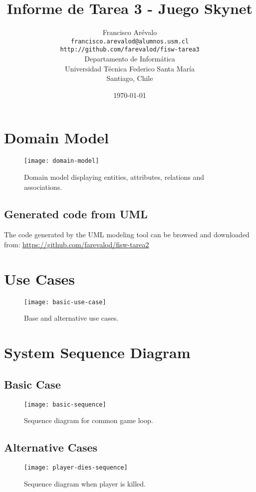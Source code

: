 \documentclass{article}
\begin{document}
\title{Informe de Tarea 3 - Juego Skynet}
\author{Francisco Ar\'evalo\\
  \texttt{francisco.arevalod@alumnos.usm.cl}\\
  \texttt{http://github.com/farevalod/fisw-tarea3}\\
  \vspace{10mm}
  Departamento de Inform\'atica\\
  Universidad T\'ecnica Federico Santa Mar\'ia\\
  Santiago, Chile}
\date{\today}
\maketitle
\tableofcontents
\section{Domain Model}
\begin{figure}[htb]
\centering
\texttt{[image: domain-model]}
\caption{Domain model displaying entities, attributes, relations and associations.}
\end{figure}
\subsection{Generated code from UML}
The code generated by the UML modeling tool can be browsed and downloaded from: 
\url{https://github.com/farevalod/fisw-tarea2}
\section{Use Cases}
\begin{figure}[htb]
\centering
\texttt{[image: basic-use-case]}
\caption{Base and alternative use cases.}
\end{figure}
\section{System Sequence Diagram}
\subsection{Basic Case}
\begin{figure}[htb]
\centering
\texttt{[image: basic-sequence]}
\caption{Sequence diagram for common game loop.}
\end{figure}
\subsection{Alternative Cases}
\begin{figure}[htb]
\centering
\texttt{[image: player-dies-sequence]}
\caption{Sequence diagram when player is killed.}
\end{figure}
\end{document}
